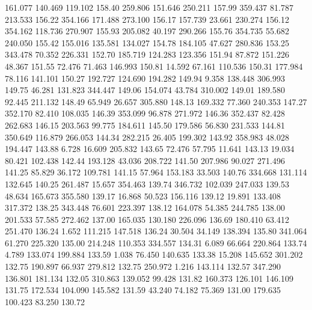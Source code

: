  161.077  140.469  119.102       158.40
 259.806  151.646  250.211       157.99
 359.437   81.787  213.533       156.22
 354.166  171.488  273.100       156.17
 157.739   23.661  230.274       156.12
 354.162  118.736  270.907       155.93
 205.082   40.197  290.266       155.76
 354.735   55.682  240.050       155.42
 155.016  135.581  134.027       154.78
 184.105   47.627  280.836       153.25
 343.478   70.352  226.331       152.70
 185.719  124.283  123.356       151.94
  87.872  151.226   48.367       151.55
  72.476   71.463  146.993       150.81
  14.592   67.161  110.536       150.31
 177.984   78.116  141.101       150.27
 192.727  124.690  194.282       149.94
   9.358  138.448  306.993       149.75
  46.281  131.823  344.447       149.06
 154.074   43.784  310.002       149.01
 189.580   92.445  211.132       148.49
  65.949   26.657  305.880       148.13
 169.332   77.360  240.353       147.27
 352.170   82.410  108.035       146.39
 353.099   96.878  271.972       146.36
 352.437   82.428  262.683       146.15
 203.563   99.775  184.611       145.50
 179.586   56.830  231.533       144.81
 350.649  116.879  266.053       144.34
 282.215   26.405  199.302       143.92
 358.983   48.028  194.447       143.88
   6.728   16.609  205.832       143.65
  72.476   57.795   11.641       143.13
  19.034   80.421  102.438       142.44
 193.128   43.036  208.722       141.50
 207.986   90.027  271.496       141.25
  85.829   36.172  109.781       141.15
  57.964  153.183   33.503       140.76
 334.668  131.114  132.645       140.25
 261.487   15.657  354.463       139.74
 346.732  102.039  247.033       139.53
  48.634  165.673  355.580       139.17
  16.868   50.523  156.116       139.12
  19.891  133.408  317.372       138.25
 343.448   76.601  223.397       138.12
 164.078   54.385  244.785       138.00
 201.533   57.585  272.462       137.00
 165.035  130.180  226.096       136.69
 180.410   63.412  251.470       136.24
   1.652  111.215  147.518       136.24
  30.504   34.149  138.394       135.80
 341.064   61.270  225.320       135.00
 214.248  110.353  334.557       134.31
   6.089   66.664  220.864       133.74
   4.789  133.074  199.884       133.59
   1.038   76.450  140.635       133.38
  15.208  145.652  301.202       132.75
 190.897   66.937  279.812       132.75
 250.972    1.216  143.114       132.57
 347.290  136.801  181.134       132.05
 310.863  139.052   99.428       131.82
 160.373  126.101  146.109       131.75
 172.534  104.090  145.582       131.59
  43.240   74.182   75.369       131.00
 179.635  100.423   83.250       130.72
